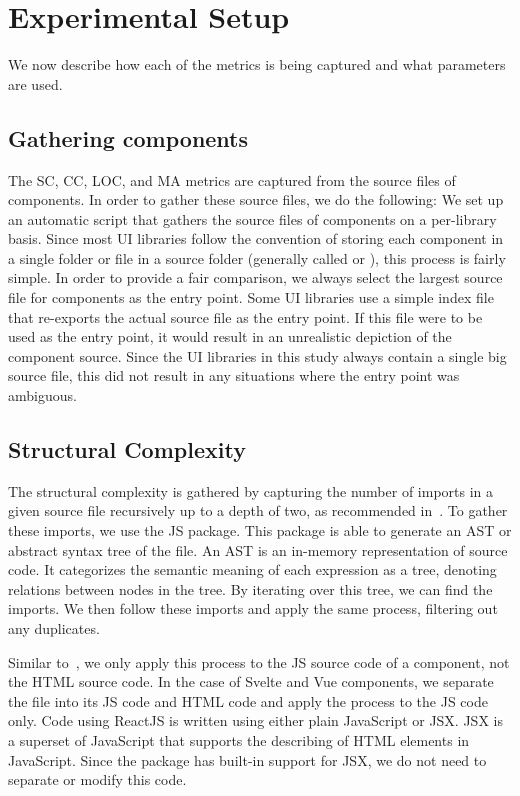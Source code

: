 \chapter{Experimental Setup}\label{chap:experimental-setup}
We now describe how each of the metrics is being captured and what parameters are used.

\section{Gathering components}\label{sec:experimental-setup:gathering-components}
The SC, CC, LOC, and MA metrics are captured from the source files of components. In order to gather these source files, we do the following: We set up an automatic script that gathers the source files of components on a per-library basis. Since most UI libraries follow the convention of storing each component in a single folder or file in a source folder (generally called  or ), this process is fairly simple. In order to provide a fair comparison, we always select the largest source file for components as the entry point. Some UI libraries use a simple index file that re-exports the actual source file as the entry point. If this file were to be used as the entry point, it would result in an unrealistic depiction of the component source. Since the UI libraries in this study always contain a single big source file, this did not result in any situations where the entry point was ambiguous.

\section{Structural Complexity}
The structural complexity is gathered by capturing the number of imports in a given source file recursively up to a depth of two, as recommended in~\cite{martinez-ortiz2016quality}. To gather these imports, we use the  JS package. This package is able to generate an AST or abstract syntax tree of the file. An AST is an in-memory representation of source code. It categorizes the semantic meaning of each expression as a tree, denoting relations between nodes in the tree. By iterating over this tree, we can find the imports. We then follow these imports and apply the same process, filtering out any duplicates.

Similar to~\cite{martinez-ortiz2016quality}, we only apply this process to the JS source code of a component, not the HTML source code. In the case of Svelte and Vue components, we separate the file into its JS code and HTML code and apply the process to the JS code only. Code using ReactJS is written using either plain JavaScript or JSX. JSX is a superset of JavaScript that supports the describing of HTML elements in JavaScript. Since the  package has built-in support for JSX, we do not need to separate or modify this code.

